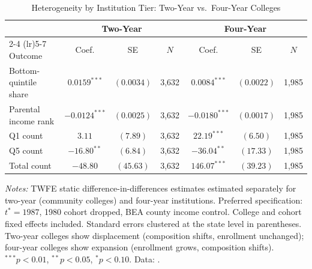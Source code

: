 \begin{table}[H]
\centering
\begin{threeparttable}
\caption{Heterogeneity by Institution Tier: Two-Year vs.\ Four-Year Colleges}
\label{tab:tier_het}
\begin{tabular}{lcccccc}
\toprule
 & \multicolumn{3}{c}{Two-Year} & \multicolumn{3}{c}{Four-Year} \\
\cmidrule(lr){2-4} \cmidrule(lr){5-7}
Outcome & Coef. & SE & $N$ & Coef. & SE & $N$ \\
\midrule
Bottom-quintile share & $0.0159^{***}$ & $(0.0034)$ & 3,632 & $0.0084^{***}$ & $(0.0022)$ & 1,985 \\
Parental income rank & $-0.0124^{***}$ & $(0.0025)$ & 3,632 & $-0.0180^{***}$ & $(0.0017)$ & 1,985 \\
\addlinespace
Q1 count & $3.11$ & $(7.89)$ & 3,632 & $22.19^{***}$ & $(6.50)$ & 1,985 \\
Q5 count & $-16.80^{**}$ & $(6.84)$ & 3,632 & $-36.04^{**}$ & $(17.33)$ & 1,985 \\
Total count & $-48.80$ & $(45.63)$ & 3,632 & $146.07^{***}$ & $(39.23)$ & 1,985 \\
\bottomrule
\end{tabular}
\begin{tablenotes}[flushleft]
\footnotesize
\item \textit{Notes:} TWFE static difference-in-differences estimates
  estimated separately for two-year (community colleges) and four-year
  institutions. Preferred specification: $t^* = 1987$, 1980 cohort
  dropped, BEA county income control. College and cohort fixed effects
  included. Standard errors clustered at the state level in parentheses.
  Two-year colleges show displacement (composition shifts, enrollment
  unchanged); four-year colleges show expansion (enrollment grows,
  composition shifts). $^{***}p<0.01$, $^{**}p<0.05$, $^{*}p<0.10$.
  Data: \textcite{chetty2020mobility}.
\end{tablenotes}
\end{threeparttable}
\end{table}

